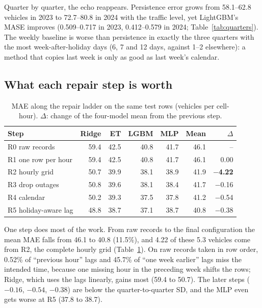 \documentclass[sigconf]{acmart}
\begin{document}
Quarter by quarter, the echo reappears. Persistence error grows from 58.1--62.8 vehicles in 2023 to 72.7--80.8 in 2024 with the traffic level, yet LightGBM's MASE improves (0.509--0.717 in 2023, 0.412--0.579 in 2024; Table~\ref{tab:quarters}). The weekly baseline is worse than persistence in exactly the three quarters with the most week-after-holiday days (6, 7 and 12 days, against 1--2 elsewhere): a method that copies last week is only as good as last week's calendar.

\subsection{What each repair step is worth}
\begin{table}[t]
  \caption{MAE along the repair ladder on the same test rows (vehicles per cell-hour). $\Delta$: change of the four-model mean from the previous step.}
  \label{tab:ladder}
  \small
  \setlength{\tabcolsep}{3.5pt}
  \begin{tabular}{lrrrrrr}
    \toprule
    Step & Ridge & ET & LGBM & MLP & Mean & $\Delta$ \\
    \midrule
    R0 raw records        & 59.4 & 42.5 & 40.8 & 41.7 & 46.1 & -- \\
    R1 one row per hour   & 59.4 & 42.5 & 40.8 & 41.7 & 46.1 & 0.00 \\
    R2 hourly grid        & 50.7 & 39.9 & 38.1 & 38.9 & 41.9 & \textbf{$-$4.22} \\
    R3 drop outages       & 50.8 & 39.6 & 38.1 & 38.4 & 41.7 & $-$0.16 \\
    R4 calendar           & 50.2 & 39.3 & 37.5 & 37.8 & 41.2 & $-$0.54 \\
    R5 holiday-aware lag  & 48.8 & 38.7 & 37.1 & 38.7 & 40.8 & $-$0.38 \\
    \bottomrule
  \end{tabular}
\end{table}

One step does most of the work. From raw records to the final configuration the mean MAE falls from 46.1 to 40.8 (11.5\%), and 4.22 of these 5.3 vehicles come from R2, the complete hourly grid (Table~\ref{tab:ladder}). On raw records taken in row order, 0.52\% of ``previous hour'' lags and 45.7\% of ``one week earlier'' lags miss the intended time, because one missing hour in the preceding week shifts the rows; Ridge, which uses the lags linearly, gains most (59.4 to 50.7). The later steps ($-0.16$, $-0.54$, $-0.38$) are below the quarter-to-quarter SD, and the MLP even gets worse at R5 (37.8 to 38.7).
\end{document}
